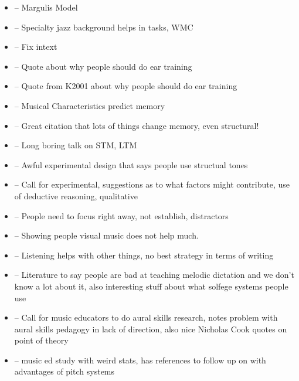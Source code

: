 \documentclass[]{book}
\providecommand{\tightlist}{%
  \setlength{\itemsep}{0pt}\setlength{\parskip}{0pt}}
\theoremstyle{definition}
\theoremstyle{definition}
\theoremstyle{definition}
\theoremstyle{remark}
\begin{document}
\begin{itemize}
\tightlist
\item
  \citep{margulisModelMelodicExpectation2005} -- Margulis Model
\item
  \citep{nicholsScoreOneJazz2018} -- Specialty jazz background helps in
  tasks, WMC
\item
  \citep{NASM201718HandbookPdf2018} -- Fix intext
\item
  \citep{schumann1860musikalische} -- Quote about why people should do
  ear training
\item
  \citep{smith1934solfege} -- Quote from K2001 about why people should
  do ear training
\item
  \citep{longRelationshipsPitchMemory1977} -- Musical Characteristics
  predict memory
\item
  \citep{taylorStrategiesMemoryShort1983} -- Great citation that lots of
  things change memory, even structural!
\item
  \citep{tallaricoStudyThreePhase1974} -- Long boring talk on STM, LTM
\item
  \citep{ouraConstructingRepresentationMelody1991a} -- Awful
  experimental design that says people use structual tones
\item
  \citep{buonviriExplorationUndergraduateMusic2014} -- Call for
  experimental, suggestions as to what factors might contribute, use of
  deductive reasoning, qualitative
\item
  \citep{buonviriEffectsPreparatorySinging2015} -- People need to focus
  right away, not establish, distractors
\item
  \citep{buonviriEffectsMusicNotation2015} -- Showing people visual
  music does not help much.
\item
  \citep{buonviriEffectsTwoListening2017} -- Listening helps with other
  things, no best strategy in terms of writing
\item
  \citep{buonviriMelodicDictationInstruction2015} -- Literature to say
  people are bad at teaching melodic dictation and we don't know a lot
  about it, also interesting stuff about what solfege systems people use
\item
  \citep{davidbutlerWhyGulfMusic1997a} -- Call for music educators to do
  aural skills research, notes problem with aural skills pedagogy in
  lack of direction, also nice Nicholas Cook quotes on point of theory
\item
  \citep{furbyEffectsPeerTutoring2016} -- music ed study with weird
  stats, has references to follow up on with advantages of pitch systems

\end{itemize}
\end{document}
